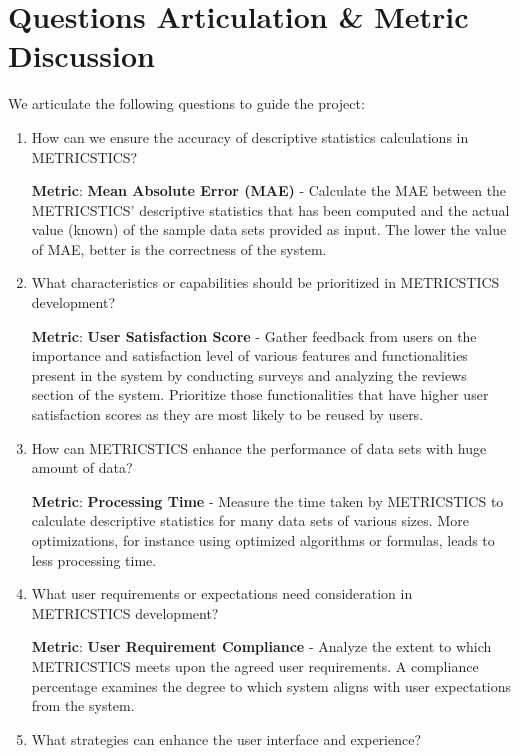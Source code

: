 \section{Questions Articulation \& Metric Discussion}
We articulate the following questions to guide the project:
\begin{enumerate}
    \item How can we ensure the accuracy of descriptive statistics calculations in METRICSTICS?

    \textbf{Metric}: \textbf{Mean Absolute Error (MAE)} \cite{mean-absolute-error} - Calculate the MAE between the \mbox{METRICSTICS'} descriptive statistics that has been computed and the actual value (known) of the sample data sets provided as input. The lower the value of MAE, better is the correctness of the system.

    \item What characteristics or capabilities should be prioritized in METRICSTICS development?

    \textbf{Metric}: \textbf{User Satisfaction Score} \cite{customer-satisfaction-score} - Gather feedback from users on the importance and satisfaction level of various features and functionalities present in the system by conducting surveys and analyzing the reviews section of the system. Prioritize those functionalities that have higher user satisfaction scores as they are most likely to be reused by users.


    \item How can METRICSTICS enhance the performance of data sets with huge amount of data?
    
    \textbf{Metric}: \textbf{Processing Time} - Measure the time taken by METRICSTICS to calculate \mbox{descriptive} statistics for many data sets of various sizes. More optimizations, for instance using optimized algorithms or formulas, leads to less processing time.

    \item What user requirements or expectations need consideration in METRICSTICS development?

    \textbf{Metric}: \textbf{User Requirement Compliance} - Analyze the extent to which METRICSTICS meets upon the agreed user requirements. A compliance percentage examines the degree to which system aligns with user expectations from the system.

    \item What strategies can enhance the user interface and experience?


\end{enumerate}

